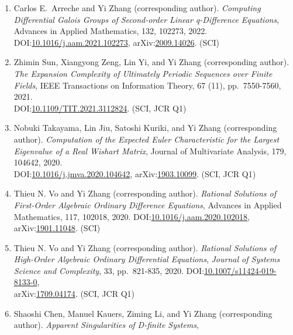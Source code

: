 \documentclass[a4paper,12pt]{article}
\begin{document}
\begin{enumerate}
{\em On Existence and Uniqueness of Formal Power Series Solutions of Algebraic Ordinary
     Differential Equations},  Mediterranean Journal of Mathematics, 19, 74, 2022. 
\\ DOI:\href{https://doi.org/10.1007/s00009-022-01984-w}{10.1007/s00009-022-01984-w}, 
arXiv:\href{https://arxiv.org/abs/1803.09646}{1803.09646}. (SCI, JCR Q1) 
\item Carlos E.\ Arreche and Yi Zhang (corresponding author). 
{\em Computing Differential Galois Groups of Second-order Linear q-Difference Equations}, Advances in Applied Mathematics, 132, 102273, 2022. 
DOI:\href{https://doi.org/10.1016/j.aam.2021.102273}{10.1016/j.aam.2021.102273}, 
arXiv:\href{https://arxiv.org/abs/2009.14026}{2009.14026}. (SCI)
\item Zhimin Sun,  Xiangyong Zeng, Lin Yi, and Yi Zhang (corresponding author). 
{\em The Expansion Complexity of Ultimately Periodic Sequences over Finite Fields},  IEEE Transactions on Information Theory, 67 (11), pp.\ 7550-7560, 2021. \\ 
DOI:\href{https://doi.org/10.1109/TIT.2021.3112824}{10.1109/TIT.2021.3112824}. (SCI, JCR Q1)
 \item Nobuki Takayama, Lin Jiu, Satoshi Kuriki, and Yi Zhang (corresponding author). 
 {\em Computation of the Expected Euler Characteristic for the Largest Eigenvalue of a Real Wishart Matrix}, Journal of Multivariate Analysis, 179, 104642, 2020. \\
 DOI:\href{https://doi.org/10.1016/j.jmva.2020.104642}{10.1016/j.jmva.2020.104642}, 
 arXiv:\href{http://arxiv.org/abs/1903.10099}{1903.10099}. (SCI, JCR Q1)
 \item Thieu N. Vo and Yi Zhang (corresponding author). 
{\em Rational Solutions of First-Order Algebraic Ordinary Difference Equations},  Advances in Applied Mathematics, 117, 102018, 2020. 
DOI:\href{https://doi.org/10.1016/j.aam.2020.102018}{10.1016/j.aam.2020.102018},
arXiv:\href{http://arxiv.org/abs/1901.11048}{1901.11048}. (SCI)
 \item Thieu N. Vo and Yi Zhang (corresponding author). {\em Rational Solutions of High-Order Algebraic Ordinary Differential Equations},  {\em Journal of Systems Science and Complexity}, 33, pp.\ 821-835, 2020. DOI:\href{https://link.springer.com/article/10.1007/s11424-019-8133-0}{10.1007/s11424-019-8133-0}, \\
 arXiv:\href{https://arxiv.org/abs/1709.04174}{1709.04174}. (SCI, JCR Q1)
  \item Shaoshi Chen, Manuel Kauers, Ziming Li, and Yi Zhang (corresponding author). {\em Apparent Singularities of D-finite Systems}, 

\end{enumerate}
\end{document}
